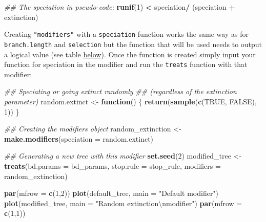 \documentclass[
]{book}
\newenvironment{Shaded}{\begin{snugshade}}{\end{snugshade}}
\newcommand{\CharTok}[1]{\textcolor[rgb]{0.31,0.60,0.02}{#1}}
\newcommand{\CommentTok}[1]{\textcolor[rgb]{0.56,0.35,0.01}{\textit{#1}}}
\newcommand{\ControlFlowTok}[1]{\textcolor[rgb]{0.13,0.29,0.53}{\textbf{#1}}}
\newcommand{\DataTypeTok}[1]{\textcolor[rgb]{0.13,0.29,0.53}{#1}}
\newcommand{\DecValTok}[1]{\textcolor[rgb]{0.00,0.00,0.81}{#1}}
\newcommand{\KeywordTok}[1]{\textcolor[rgb]{0.13,0.29,0.53}{\textbf{#1}}}
\newcommand{\NormalTok}[1]{#1}
\newcommand{\OperatorTok}[1]{\textcolor[rgb]{0.81,0.36,0.00}{\textbf{#1}}}
\newcommand{\OtherTok}[1]{\textcolor[rgb]{0.56,0.35,0.01}{#1}}
\newcommand{\StringTok}[1]{\textcolor[rgb]{0.31,0.60,0.02}{#1}}
\begin{document}
\begin{Shaded}
\begin{Highlighting}[]
\CommentTok{\#\# The speciation in pseudo{-}code:}
\KeywordTok{runif}\NormalTok{(}\DecValTok{1}\NormalTok{) }\OperatorTok{\textless{}}\StringTok{ }\NormalTok{speciation}\OperatorTok{/}\StringTok{ }\NormalTok{(speciation }\OperatorTok{+}\StringTok{ }\NormalTok{extinction)}
\end{Highlighting}
\end{Shaded}

Creating \texttt{"modifiers"} with a \texttt{speciation} function works the same way as for \texttt{branch.length} and \texttt{selection} but the function that will be used needs to output a logical value (see table \protect\hyperlink{summarymodifiers}{below}).
Once the function is created simply input your function for speciation in the modifier and run the \texttt{treats} function with that modifier:

\begin{Shaded}
\begin{Highlighting}[]
\CommentTok{\#\# Speciating or going extinct randomly}
\CommentTok{\#\# (regardless of the extinction parameter)}
\NormalTok{random.extinct  \textless{}{-}}\StringTok{ }\ControlFlowTok{function}\NormalTok{() \{}
    \KeywordTok{return}\NormalTok{(}\KeywordTok{sample}\NormalTok{(}\KeywordTok{c}\NormalTok{(}\OtherTok{TRUE}\NormalTok{, }\OtherTok{FALSE}\NormalTok{), }\DecValTok{1}\NormalTok{))}
\NormalTok{\}}

\CommentTok{\#\# Creating the modifiers object}
\NormalTok{random\_extinction \textless{}{-}}\StringTok{ }\KeywordTok{make.modifiers}\NormalTok{(}\DataTypeTok{speciation =}\NormalTok{ random.extinct)}

\CommentTok{\#\# Generating a new tree with this modifier}
\KeywordTok{set.seed}\NormalTok{(}\DecValTok{2}\NormalTok{)}
\NormalTok{modified\_tree \textless{}{-}}\StringTok{ }\KeywordTok{treats}\NormalTok{(}\DataTypeTok{bd.params =}\NormalTok{ bd\_params,}
                      \DataTypeTok{stop.rule =}\NormalTok{ stop\_rule,}
                      \DataTypeTok{modifiers =}\NormalTok{ random\_extinction)}

\KeywordTok{par}\NormalTok{(}\DataTypeTok{mfrow =} \KeywordTok{c}\NormalTok{(}\DecValTok{1}\NormalTok{,}\DecValTok{2}\NormalTok{))}
\KeywordTok{plot}\NormalTok{(default\_tree,  }\DataTypeTok{main =} \StringTok{"Default modifier"}\NormalTok{)}
\KeywordTok{plot}\NormalTok{(modified\_tree, }\DataTypeTok{main =} \StringTok{"Random extinction}\CharTok{\textbackslash{}n}\StringTok{modifier"}\NormalTok{)}
\KeywordTok{par}\NormalTok{(}\DataTypeTok{mfrow =} \KeywordTok{c}\NormalTok{(}\DecValTok{1}\NormalTok{,}\DecValTok{1}\NormalTok{))}
\end{Highlighting}
\end{Shaded}
\end{document}
